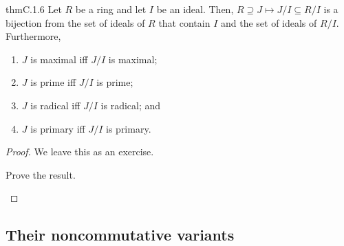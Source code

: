 \begin{thm}{}{thmC.1.6}
	Let $R$ be a ring and let $I$ be an ideal.  Then, $R\supseteq J\mapsto J/I\subseteq R/I$ is a bijection from the set of ideals of $R$ that contain $I$ and the set of ideals of $R/I$.  Furthermore,
	\begin{enumerate}
		\item \label{thmC.1.6(i)}$J$ is maximal iff $J/I$ is maximal;
		\item \label{thmC.1.6(ii)}$J$ is prime iff $J/I$ is prime;
		\item \label{thmC.1.6(iii)}$J$ is radical iff $J/I$ is radical; and
		\item \label{thmC.1.6(iv)}$J$ is primary iff $J/I$ is primary.
	\end{enumerate}
	\begin{proof}
		We leave this as an exercise.
		\begin{exr}[breakable=false]{}{}
			Prove the result.
		\end{exr}
	\end{proof}
\end{thm}

\subsection{Their noncommutative variants}

